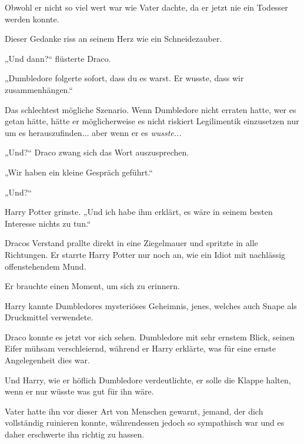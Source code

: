 {Obwohl er nicht so viel wert war wie Vater dachte, da er jetzt nie ein Todesser werden konnte.

Dieser Gedanke riss an seinem Herz wie ein Schneidezauber.

„Und dann?“ flüsterte Draco.

„Dumbledore folgerte sofort, dass du es warst. Er wusste, dass wir zusammenhängen.“

Das schlechtest mögliche Szenario. Wenn Dumbledore nicht erraten hatte, wer es getan hätte, hätte er möglicherweise es nicht riskiert Legilimentik einzusetzen nur um es herauszufinden... aber wenn er es \emph{wusste...}

„Und?“ Draco zwang sich das Wort auszusprechen.

„Wir haben ein kleine Gespräch geführt.“

„Und?“

Harry Potter grinste. „Und ich habe ihm erklärt, es wäre in seinem besten Interesse nichts zu tun.“

Dracos Verstand prallte direkt in eine Ziegelmauer und spritzte in alle Richtungen. Er starrte Harry Potter nur noch an, wie ein Idiot mit nachlässig offenstehendem Mund.

Er brauchte einen Moment, um sich zu erinnern.

Harry kannte Dumbledores mysteriöses Geheimnis, jenes, welches auch Snape als Druckmittel verwendete.

Draco konnte es jetzt vor sich sehen. Dumbledore mit sehr ernstem Blick, seinen Eifer mühsam verschleiernd, während er Harry erklärte, was für eine ernste Angelegenheit dies war.

Und Harry, wie er höflich Dumbledore verdeutlichte, er solle die Klappe halten, wenn er nur wüsste was gut für ihn wäre.

Vater hatte ihn vor dieser Art von Menschen gewarnt, jemand, der dich vollständig ruinieren konnte, währendessen jedoch so sympathisch war und es daher erschwerte ihn richtig zu hassen.

}
